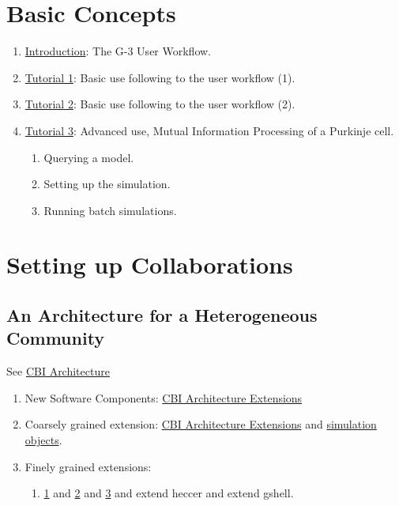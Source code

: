 \documentclass[12pt]{article}
\begin{document}
\section{Basic Concepts}

\begin{enumerate}
\item \href{../workflow-user/workflow-user.tex}{Introduction}: The G-3 User Workflow.
\item \href{../tutorial1/tutorial1.tex}{Tutorial 1}: Basic use following to the user workflow (1).
\item \href{../tutorial2/tutorial2.tex}{Tutorial 2}: Basic use following to the user workflow (2).
\item \href{../tutorial3/tutorial3.tex}{Tutorial 3}: Advanced use,
  Mutual Information Processing of a Purkinje cell.
  \begin{enumerate}
  \item Querying a model.
  \item Setting up the simulation.
  \item Running batch simulations.
  \end{enumerate}
\end{enumerate}


\section{Setting up Collaborations}

\subsection{An Architecture for a Heterogeneous Community}

See \href{../genesis-overview/genesis-overview.tex}{CBI Architecture}

\begin{enumerate}
\item New Software Components:
  \href{../genesis-addto-component-developerpackage/genesis-addto-component-developerpackage.tex}{CBI
    Architecture Extensions}
\item Coarsely grained extension:
  \href{../genesis-add-feature-ssp/genesis-add-feature-ssp.tex}{CBI
    Architecture Extensions} and
  \href{../genesis-add-object-solver/genesis-add-object-solver.tex}{simulation
    objects}.
\item Finely grained extensions:
  \begin{enumerate}
  \item
    \href{../genesis-extend-model-container/genesis-extend-model-container.tex}{1}
    and
    \href{../genesis-extend-model-container-detail/genesis-extend-model-container-detail.tex}{2}
    and
    \href{../genesis-extend-functionality/genesis-extend-functionality.tex}{3}
    and extend heccer and extend gshell.
  \end{enumerate}
\end{enumerate}
\end{document}
